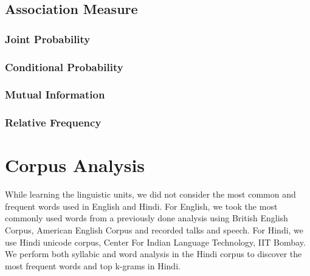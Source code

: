 \documentclass[12pt, a4paper]{report}
\begin{document}
\section{Association Measure}

\subsection{Joint Probability}
\subsection{Conditional Probability}
\subsection{Mutual Information}
\subsection{Relative Frequency}


\chapter{Corpus Analysis}
While learning the linguistic units, we did not consider the most common and frequent words used in English and Hindi. For English, we took the most commonly used words from a previously done analysis using British English Corpus, American English Corpus and recorded talks and speech\cite{}. For Hindi, we use Hindi unicode corpus, Center For Indian Language Technology, IIT Bombay\cite{}. We perform both syllabic and word analysis in the Hindi corpus to discover the most frequent words and top k-grams in Hindi. 
\end{document}
